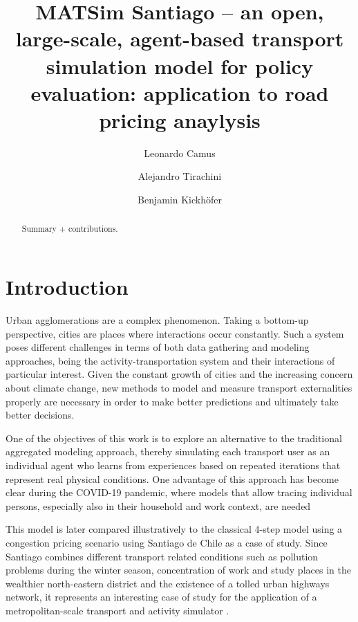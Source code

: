 \documentclass[Journal,letterpaper]{ascelike-new}
\begin{document}
\title{MATSim Santiago -- an open, large-scale, agent-based transport simulation model for policy evaluation: application to road pricing anaylysis}

\author[1]{Leonardo Camus}
\author[2]{Alejandro Tirachini}
\author[3]{Benjamin Kickh\"ofer}


\maketitle



\begin{abstract}
Summary + contributions.
\end{abstract}

\section{Introduction}

Urban agglomerations are a complex phenomenon. Taking a bottom-up perspective, cities are places where interactions occur constantly. Such a system poses different challenges in terms of both data gathering and modeling approaches, being the activity-transportation system and their interactions of particular interest. Given the constant growth of cities and the increasing concern about climate change, new methods to model and measure transport externalities properly are necessary in order to make better predictions and ultimately take better decisions.

One of the objectives of this work is to explore an alternative to the traditional aggregated modeling approach, thereby simulating each transport user as an individual agent who learns from experiences based on repeated iterations that represent real physical conditions. One advantage of this approach has become clear during the COVID-19 pandemic, where models that allow tracing individual persons, especially also in their household and work context, are needed

This model is later compared illustratively to the classical 4-step model using a congestion pricing scenario using Santiago de Chile as a case of study. Since Santiago combines different transport related conditions such as pollution problems during the winter season, concentration of work and study places in the wealthier north-eastern district and the existence of a tolled urban highways network, it represents an interesting case of study for the application of a metropolitan-scale transport and activity simulator \citep{KickhoeferEtAl2016}.
\end{document}
